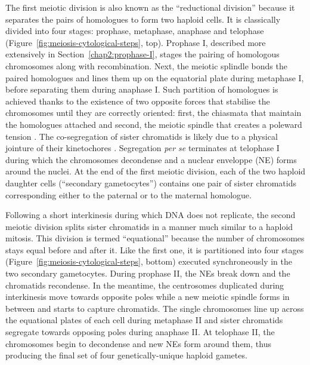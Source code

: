The first meiotic division is also known as the “reductional division” because it separates the pairs of homologues to form two haploid cells. 
It is classically divided into four stages: prophase, metaphase, anaphase and telophase (Figure~\ref{fig:meiosis-cytological-steps}, top).
Prophase I, described more extensively in Section~\ref{chap2:prophase-I}, stages the pairing of homologous chromosomes along with recombination.
Next, the meiotic splindle bonds the paired homologues and lines them up on the equatorial plate during metaphase I, before separating them during anaphase I. 
Such partition of homologues is achieved thanks to the existence of two opposite forces that stabilise the chromosomes until they are correctly oriented: first, the chiasmata that maintain the homologues attached and second, the meiotic spindle that creates a poleward tension \citep{petronczki2003menage}.
The co-segregation of sister chromatids is likely due to a physical jointure of their kinetochores \citep{nasmyth2015meiotic}.
Segregation \textit{per se} terminates at telophase I during which the chromosomes decondense and a nuclear enveloppe (NE) forms around the nuclei.
At the end of the first meiotic division, each of the two haploid daughter cells (“secondary gametocytes”) contains one pair of sister chromatids corresponding either to the paternal or to the maternal homologue.

Following a short interkinesis during which DNA does not replicate, the second meiotic division splits sister chromatids in a manner much similar to a haploid mitosis. 
This division is termed “equational” because the number of chromosomes stays equal before and after it.
Like the first one, it is partitioned into four stages (Figure~\ref{fig:meiosis-cytological-steps}, bottom) executed synchroneously in the two secondary gametocytes.
During prophase II, the NEs break down and the chromatids recondense. 
In the meantime, the centrosomes duplicated during interkinesis move towards opposite poles while a new meiotic spindle forms in between and starts to capture chromatids.
The single chromosomes line up across the equational plates of each cell during metaphase II and sister chromatids segregate towards opposing poles during anaphase II\@.
At telophase II, the chromosomes begin to decondense and new NEs form around them, thus producing the final set of four genetically-unique haploid gametes.\\


